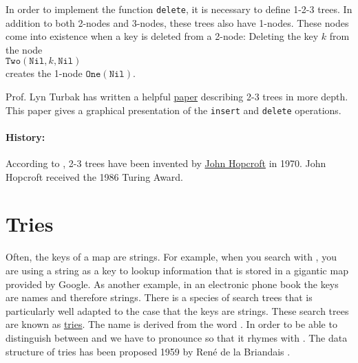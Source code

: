 \begin{enumerate}[(a)]
      In order to implement the function \texttt{delete}, it is necessary to define 1-2-3 trees.
      In addition to both 2-nodes and 3-nodes, these trees also have 1-nodes.  These nodes come into existence
      when a key is deleted from a 2-node:  Deleting the key $k$ from the node
      \\[0.2cm]
      \hspace*{1.3cm}
      $\texttt{Two}(\texttt{Nil}, k, \texttt{Nil})$
      \\[0.2cm]
      creates the 1-node $\texttt{One}(\texttt{Nil})$.
\end{enumerate}
Prof. Lyn Turbak has written a helpful
\href{http://www.cs.princeton.edu/~dpw/courses/cos326-12/ass/2-3-trees.pdf}{paper} describing 2-3 trees in more
depth.  This paper gives a graphical presentation of the \texttt{insert} and \texttt{delete} operations.

\paragraph{History:}
According to \cite{cormen:09}, 2-3 trees have been invented by
\href{https://en.wikipedia.org/wiki/John_Hopcroft}{John Hopcroft} in 1970.  John Hopcroft received the 1986
Turing Award. 



\section{Tries}
Often, the keys of a map are strings.  For example, when you search with 
\href{https://www.google.com}{}, you are using
a string as a key to lookup information that is stored in a gigantic map provided by Google.
As another example, in an electronic phone book the keys are names and therefore strings.  
There is a species of search trees that is particularly well adapted to the case that the keys are
strings.  These search trees are known as \href{https://en.wikipedia.org/?title=Trie}{tries}.  
The name is derived from the word
.  In order to be able to distinguish between  and
 we have to pronounce    so that it rhymes with .   The data
structure of tries has been proposed 1959 by Ren\'e de la Briandais \cite{briandais:59}.

